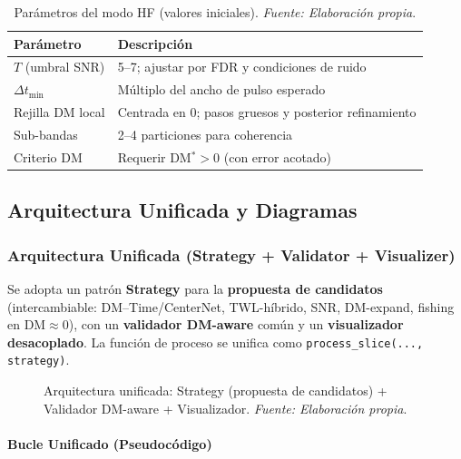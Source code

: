 \begin{table}[H]
  \centering
  \caption{\label{tab:param_hf} Parámetros del modo HF (valores iniciales). \textit{Fuente: Elaboración propia}.}
  \begin{tabular}{p{} p{}}
    \toprule
    \textbf{Parámetro} & \textbf{Descripción} \\
    \midrule
    $T$ (umbral SNR) & 5--7; ajustar por FDR y condiciones de ruido \\
    $\Delta t_{\min}$ & Múltiplo del ancho de pulso esperado \\
    Rejilla DM local & Centrada en 0; pasos gruesos y posterior refinamiento \\
    Sub-bandas & 2--4 particiones para coherencia \\
    Criterio DM & Requerir DM$^\ast>0$ (con error acotado) \\
    \bottomrule
  \end{tabular}
\end{table}

\subsection{Arquitectura Unificada y Diagramas}

\subsubsection{Arquitectura Unificada (Strategy + Validator + Visualizer)}

Se adopta un patrón \textbf{Strategy} para la \textbf{propuesta de candidatos} (intercambiable: DM--Time/CenterNet, TWL-híbrido, SNR, DM-expand, fishing en DM$\approx0$), con un \textbf{validador DM-aware} común y un \textbf{visualizador desacoplado}. La función de proceso se unifica como \texttt{process\_slice(..., strategy)}.

\begin{figure}[H] 
\centering 
\caption{\label{fig:arquitectura-unificada} Arquitectura unificada: Strategy (propuesta de candidatos) + Validador DM-aware + Visualizador. \textit{Fuente: Elaboración propia}.} 
\end{figure}

\paragraph{Bucle Unificado (Pseudocódigo)}


